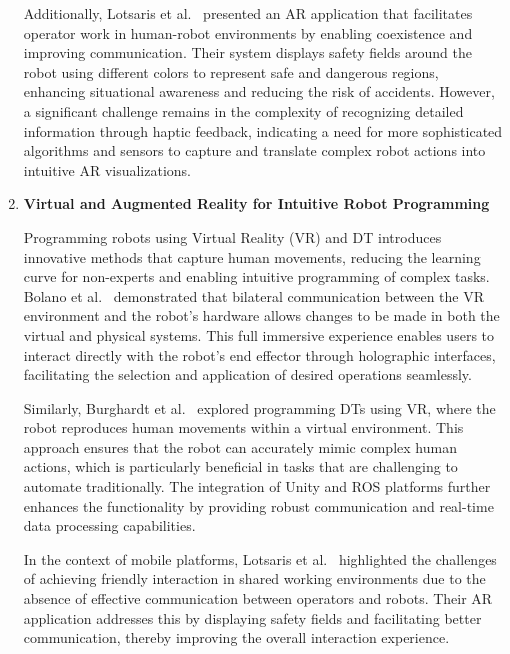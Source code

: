 \begin{enumerate}
    Additionally, Lotsaris et al.~\cite{LOTSARIS2021301} presented an \ac{AR} application that facilitates operator work in human-robot environments by 
    enabling coexistence and improving communication. Their system displays safety fields around the robot using different colors to represent safe and 
    dangerous regions, enhancing situational awareness and reducing the risk of accidents. However, a significant challenge remains in the complexity of
    recognizing detailed information through haptic feedback, indicating a need for more sophisticated algorithms and sensors to capture and translate 
    complex robot actions into intuitive \ac{AR} visualizations.
    



    \item \textbf{Virtual and Augmented Reality for Intuitive Robot Programming}
    
    Programming robots using Virtual Reality (VR) and \ac{DT} introduces innovative methods that capture human movements, reducing the learning curve for 
    non-experts and enabling intuitive programming of complex tasks. Bolano et al.~\cite{Bolano2020} demonstrated that bilateral communication between 
    the VR environment and the robot’s hardware allows changes to be made in both the virtual and physical systems. This full immersive experience 
    enables users to interact directly with the robot's end effector through holographic interfaces, facilitating the selection and application of 
    desired operations seamlessly.
    
    Similarly, Burghardt et al.~\cite{burghardt2020programming} explored programming DTs using VR, where the robot reproduces human movements within a virtual 
    environment. This approach ensures that the robot can accurately mimic complex human actions, which is particularly beneficial in tasks that are 
    challenging to automate traditionally. The integration of Unity and \ac{ROS} platforms further enhances the functionality by 
    providing robust communication and real-time data processing capabilities.
    
    In the context of mobile platforms, Lotsaris et al.~\cite{LOTSARIS2021301} highlighted the challenges of achieving friendly interaction in shared 
    working environments due to the absence of effective communication between operators and robots. Their AR application addresses this by displaying 
    safety fields and facilitating better communication, thereby improving the overall interaction experience.
    

\end{enumerate}
